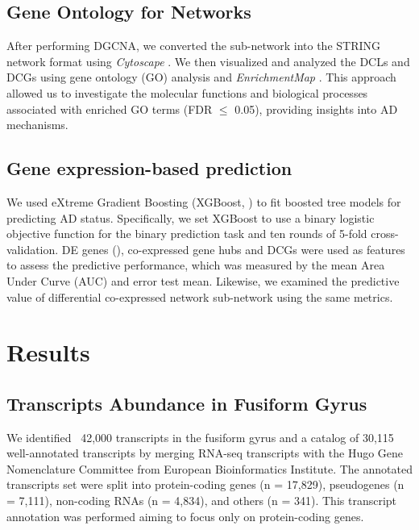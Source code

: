 \documentclass[utf8]{FrontiersinHarvard} %
\begin{document}
\subsection{Gene Ontology for Networks}

After performing DGCNA, we converted the sub-network into the STRING network format using \textit{Cytoscape} \citep{szklarczyk2023string}. We then visualized and analyzed the DCLs and DCGs using gene ontology (GO) analysis and \textit{EnrichmentMap} \citep{isserlin2014enrichment}. This approach allowed us to investigate the molecular functions and biological processes associated with enriched GO terms (FDR $\leq$ 0.05), providing insights into AD mechanisms.

\subsection{Gene expression-based prediction}

We used eXtreme Gradient Boosting (XGBoost, \citep{xgboost}) to fit boosted tree models for predicting AD status. Specifically, we set XGBoost to use a binary logistic objective function for the binary prediction task and ten rounds of 5-fold cross-validation. DE genes (\cite{cavalcante2022mitochondrial}), co-expressed gene hubs and DCGs were used as features to assess the predictive performance, which was measured by the mean Area Under Curve (AUC) and error test mean. Likewise, we examined the predictive value of differential co-expressed network sub-network using the same metrics.


\section{Results}

\subsection{Transcripts Abundance in Fusiform Gyrus}

We identified ~42,000 transcripts in the fusiform gyrus and a catalog of 30,115 well-annotated transcripts by merging RNA-seq transcripts with the Hugo Gene Nomenclature Committee from European Bioinformatics Institute. The annotated transcripts set were split into protein-coding genes (n = 17,829), pseudogenes (n = 7,111), non-coding RNAs (n = 4,834), and others (n = 341). This transcript annotation was performed aiming to focus only on protein-coding genes.
\end{document}
